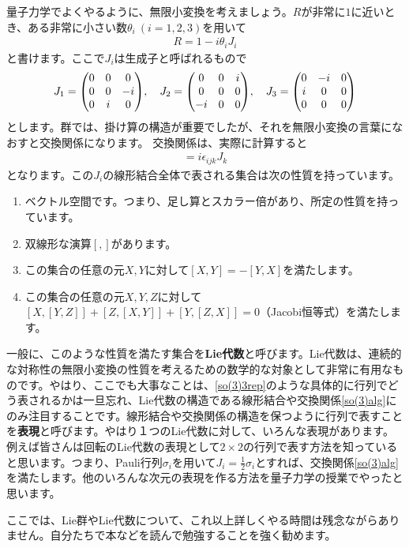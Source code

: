 \documentclass[report,paper=a4, fontsize=12pt, line_length=16cm, number_of_lines=33,dvipdfmx]{jlreq}
\numberwithin{equation}{chapter}
\newcommand{\strong}[1]{{\sffamily \bfseries #1}}
\begin{document}
量子力学でよくやるように、無限小変換を考えましょう。$R$が非常に$1$に近いとき、ある非常に小さい数$\theta_i \ (i=1,2,3)$を用いて
\begin{align}
  R=1-i\theta_i J_i
\end{align}
と書けます。ここで$J_i$は生成子と呼ばれるもので
\begin{align}
  J_1=\mqty(
    0 & 0 & 0\\
    0 & 0 & -i\\
    0 & i & 0
  ),\quad
  J_2=\mqty(
    0 & 0 & i\\
    0 & 0 & 0\\
    -i & 0 & 0
  ),\quad
  J_3=\mqty(
    0 & -i & 0\\
    i & 0 & 0\\
    0 & 0 & 0
  )\label{so(3)3rep}
\end{align}
とします。群では、掛け算の構造が重要でしたが、それを無限小変換の言葉になおすと交換関係になります。
交換関係は、実際に計算すると
\begin{align}
  [J_i,J_j]=i\epsilon_{ijk}J_k\label{so(3)alg}
\end{align}
となります。この$J_i$の線形結合全体で表される集合は次の性質を持っています。
\begin{enumerate}
  \item ベクトル空間です。つまり、足し算とスカラー倍があり、所定の性質を持っています。
  \item 双線形な演算$[,]$があります。
  \item この集合の任意の元$X,Y$に対して$[X,Y]=-[Y,X]$を満たします。
  \item この集合の任意の元$X,Y,Z$に対して$[X,[Y,Z]]+[Z,[X,Y]]+[Y,[Z,X]]=0$（Jacobi恒等式）を満たします。
\end{enumerate}
一般に、このような性質を満たす集合を\strong{Lie代数}と呼びます。Lie代数は、連続的な対称性の無限小変換の性質を考えるための数学的な対象として非常に有用なものです。やはり、ここでも大事なことは、\eqref{so(3)3rep}のような具体的に行列でどう表されるかは一旦忘れ、Lie代数の構造である線形結合や交換関係\eqref{so(3)alg}にのみ注目することです。線形結合や交換関係の構造を保つように行列で表すことを\strong{表現}と呼びます。やはり１つのLie代数に対して、いろんな表現があります。例えば皆さんは回転のLie代数の表現として$2\times 2$の行列で表す方法を知っていると思います。つまり、Pauli行列$\sigma_i$を用いて$J_i=\frac12\sigma_i$とすれば、交換関係\eqref{so(3)alg}を満たします。他のいろんな次元の表現を作る方法を量子力学の授業でやったと思います。

ここでは、Lie群やLie代数について、これ以上詳しくやる時間は残念ながらありません。自分たちで本などを読んで勉強することを強く勧めます。
\end{document}
